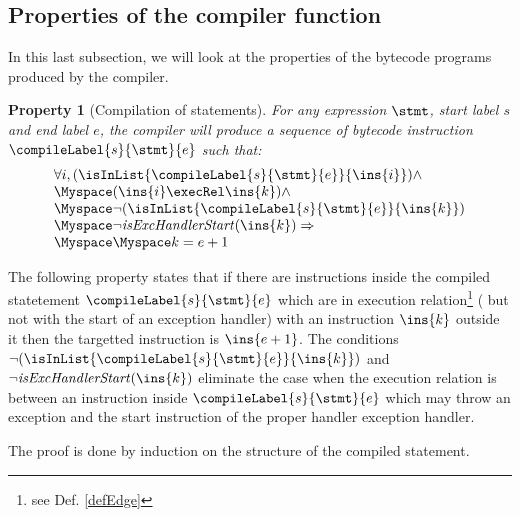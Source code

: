 \newtheorem{compProp1}{Property}[subsection] %
\newtheorem{compProp2}[compProp1]{Property} %
\newtheorem{compProp3}[compProp1]{Property} %
\newtheorem{seqInstr}{Definition}[subsection]

 
\newcommand{\isStartExc}[1]{\mbox{\rm\textit{isExcHandlerStart}}(#1)}
\subsection{Properties of the compiler function}

In this last subsection, we will look at the properties of the
 bytecode  programs produced by the compiler.





\begin{compProp1}[Compilation of statements]\label{compProp1}
    For any expression $\stmt$, start label $s$ and end label $e$,
    the compiler will produce a sequence of bytecode instruction $\compileLabel{s}{\stmt}{e}$ such that: 
           $$ \begin{array}{l} 
                             \forall i, ( \isInList{\compileLabel{s}{\stmt}{e}}{\ins{i}} ) \wedge \\
			     \Myspace ( \ins{i} \execRel \ins{k}) \wedge \\
			     \Myspace \neg (  \isInList{\compileLabel{s}{\stmt}{e} }{\ins{k}} ) \\
			     \Myspace \neg \isStartExc{\ins{k}}     \Rightarrow   \\
                             \Myspace \Myspace k = e + 1
              \end{array}$$ 
\end{compProp1}
The following property states that  if there are instructions inside the compiled statetement 
 $\compileLabel{s}{\stmt}{e}$ which are in execution relation\footnote{see Def. \ref{defEdge}} ( but not with the start of an exception handler) with an instruction 
$\ins{k}$ outside it then the targetted instruction is  $\ins{e +1}$. 
 The conditions  $ \neg (  \isInList{\compileLabel{s}{\stmt}{e} }{\ins{k}} )$ and 
$\neg \isStartExc{\ins{k}}$  eliminate the case when the execution relation is between an instruction inside 
 $\compileLabel{s}{\stmt}{e}$ which may throw an exception and the start instruction of the proper handler exception handler.

 The proof is done by induction on the structure of the compiled statement. 

